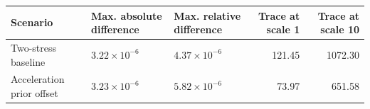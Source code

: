 \begin{tabular}{lllrr}
\toprule
Scenario & Max. absolute difference & Max. relative difference & Trace at scale 1 & Trace at scale 10 \\
\midrule
Two-stress baseline & $3.22\times10^{-6}$ & $4.37\times10^{-6}$ & 121.45 & 1072.30 \\
Acceleration prior offset & $3.23\times10^{-6}$ & $5.82\times10^{-6}$ & 73.97 & 651.58 \\
\bottomrule
\end{tabular}
